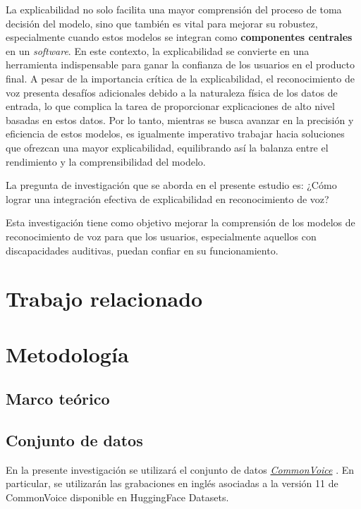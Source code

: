 \documentclass[conference]{IEEEtran}
\begin{document}
La explicabilidad no solo facilita una mayor comprensión del proceso de toma decisión del modelo, sino que también es vital para mejorar su robustez, especialmente cuando estos modelos se integran como \textbf{componentes centrales} en un \textit{software}. En este contexto, la explicabilidad se convierte en una herramienta indispensable para ganar la confianza de los usuarios en el producto final. A pesar de la importancia crítica de la explicabilidad, el reconocimiento de voz presenta desafíos adicionales debido a la naturaleza física de los datos de entrada, lo que complica la tarea de proporcionar explicaciones de alto nivel basadas en estos datos. Por lo tanto, mientras se busca avanzar en la precisión y eficiencia de estos modelos, es igualmente imperativo trabajar hacia soluciones que ofrezcan una mayor explicabilidad, equilibrando así la balanza entre el rendimiento y la comprensibilidad del modelo. 

La pregunta de investigación que se aborda en el presente estudio es: ¿Cómo lograr una integración efectiva de explicabilidad en reconocimiento de voz?

Esta investigación tiene como objetivo mejorar la comprensión de los modelos de reconocimiento de voz para que los usuarios, especialmente aquellos con discapacidades auditivas, puedan confiar en su funcionamiento.

\section{Trabajo relacionado}

\section{Metodología}

\subsection{Marco teórico}

\subsection{Conjunto de datos}

En la presente investigación se utilizará el conjunto de datos \href{https://commonvoice.mozilla.org/en/datasets}{\textit{CommonVoice}} \cite{commonvoice:2020}. En particular, se utilizarán las grabaciones en inglés asociadas a la versión 11 de CommonVoice disponible en HuggingFace Datasets.
\end{document}
